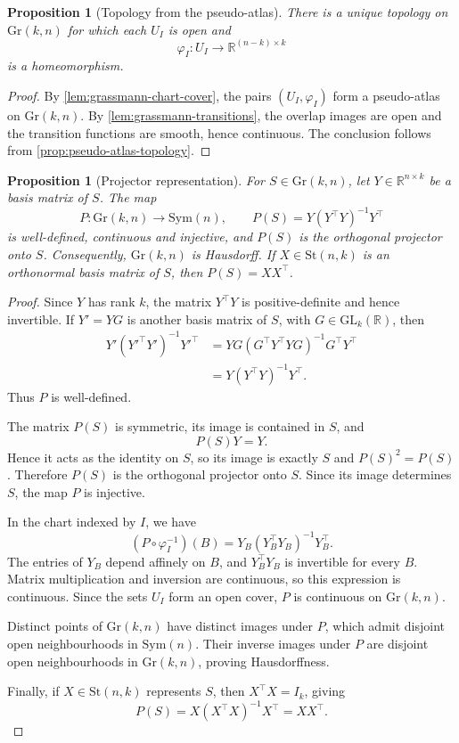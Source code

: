 \documentclass[12pt]{article}
\theoremstyle{definition}
\theoremstyle{plain}
\newtheorem{proposition}[definition]{Proposition}
\theoremstyle{remark}
\newcommand{\R}{\mathbb{R}}
\newcommand{\St}{\mathrm{St} (n,k)}
\newcommand{\Gr}{\mathrm{Gr} (k,n)}
\newcommand{\GL}{\mathrm{GL}}                %
\newcommand{\Sym}{\mathrm{Sym}}              %
\begin{document}
\begin{proposition}[Topology from the pseudo-atlas]\label{prop:grassmann-topology}
  There is a unique topology on \( \Gr \) for which each \( U_I \) is open and
  \[
    \varphi_I : U_I \longrightarrow \R^{(n-k)\times k}
  \]
  is a homeomorphism.
\end{proposition}

\begin{proof}
  By \cref{lem:grassmann-chart-cover}, the pairs \( (U_I,\varphi_I) \) form a pseudo-atlas on \( \Gr \).
  By \cref{lem:grassmann-transitions}, the overlap images are open and the transition functions are smooth, hence continuous.
  The conclusion follows from \cref{prop:pseudo-atlas-topology}.
\end{proof}

\begin{proposition}[Projector representation]\label{prop:grassmann-projector}
  For \( S \in \Gr \), let \( Y \in \R^{n \times k} \) be a basis matrix of \( S \).
  The map
  \[
    P : \Gr \longrightarrow \Sym(n), \qquad P(S) = Y(Y^\top Y)^{-1}Y^\top
  \]
  is well-defined, continuous and injective, and \( P(S) \) is the orthogonal projector onto \( S \).
  Consequently, \( \Gr \) is Hausdorff.
  If \( X \in \St \) is an orthonormal basis matrix of \( S \), then \( P(S)=XX^\top \).
\end{proposition}

\begin{proof}
  Since \( Y \) has rank \( k \), the matrix \( Y^\top Y \) is positive-definite and hence invertible.
  If \( Y'=YG \) is another basis matrix of \( S \), with \( G \in \GL_k(\R) \), then
  \[
    \begin{aligned}
      Y'(Y'^\top Y')^{-1}Y'^\top
      &= YG(G^\top Y^\top YG)^{-1}G^\top Y^\top \\
      &= Y(Y^\top Y)^{-1}Y^\top.
    \end{aligned}
  \]
  Thus \( P \) is well-defined.

  The matrix \( P(S) \) is symmetric, its image is contained in \( S \), and
  \[
    P(S)Y = Y.
  \]
  Hence it acts as the identity on \( S \), so its image is exactly \( S \) and \( P(S)^2=P(S) \).
  Therefore \( P(S) \) is the orthogonal projector onto \( S \).
  Since its image determines \( S \), the map \( P \) is injective.

  In the chart indexed by \( I \), we have
  \[
    (P \circ \varphi_I^{-1})(B) = Y_B(Y_B^\top Y_B)^{-1}Y_B^\top.
  \]
  The entries of \( Y_B \) depend affinely on \( B \), and \( Y_B^\top Y_B \) is invertible for every \( B \).
  Matrix multiplication and inversion are continuous, so this expression is continuous.
  Since the sets \( U_I \) form an open cover, \( P \) is continuous on \( \Gr \).

  Distinct points of \( \Gr \) have distinct images under \( P \), which admit disjoint open neighbourhoods in \( \Sym(n) \).
  Their inverse images under \( P \) are disjoint open neighbourhoods in \( \Gr \), proving Hausdorffness.

  Finally, if \( X \in \St \) represents \( S \), then \( X^\top X=I_k \), giving
  \[
    P(S)=X(X^\top X)^{-1}X^\top=XX^\top.
  \]
\end{proof}
\end{document}
